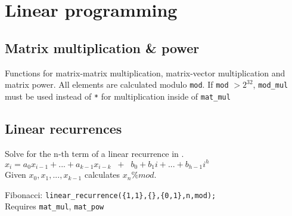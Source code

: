 \section{Linear programming}


\subsection{Matrix multiplication \& power}
Functions for matrix-matrix multiplication, matrix-vector multiplication and matrix power. All elements are calculated modulo \verb|mod|. If \verb|mod| $> 2^{32}$, \verb|mod_mul| must be used instead of \verb|*| for multiplication inside of \verb|mat_mul|


\subsection{Linear recurrences}
Solve for the n-th term of a linear recurrence in .\\
$x_i = a_0 x_{i-1} + ... + a_{k-1} x_{i-k} \;\; + \;\; b_0 + b_1 i + ... + b_{h-1} i^h$ \\
Given $x_0, x_1, ..., x_{k-1}$ calculates $x_n \% mod$.

Fibonacci: \texttt{linear\_recurrence(\{1,1\},\{\},\{0,1\},n,mod);}\\
Requires \verb|mat_mul|, \verb|mat_pow|

